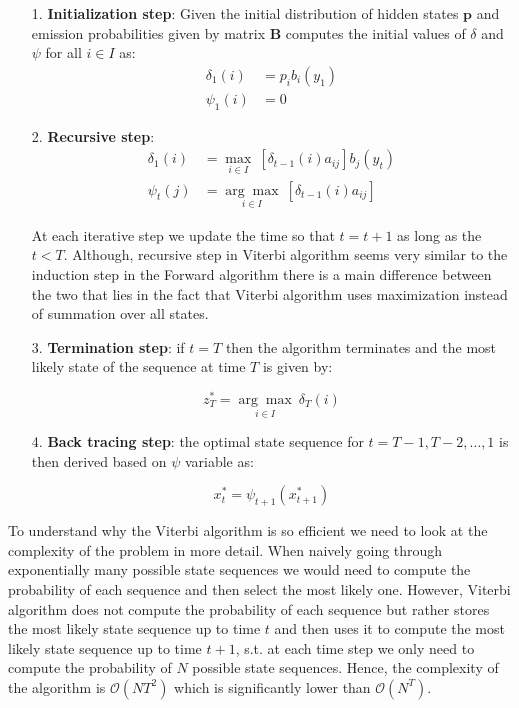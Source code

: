 \begin{itemize}
\item[1.] \textbf{Initialization step}: Given the initial distribution of hidden states $\textbf{p}$ and emission probabilities given by matrix $\textbf{B}$ computes the initial values 
of $\delta$ and $\psi$ for all $i \in I$ as:
\begin{align}
\delta_1(i) &= p_i b_i(y_1)  \\
\psi_1(i)& = 0
\end{align}

\item[2.] \textbf{Recursive step}:
\begin{align}
\delta_1(i) &= \underset{i \in I}{\max} \: \left[\delta_{t-1}(i)a_{ij}\right] b_j(y_t)  \\
\psi_t(j)& = \underset{i \in I}{\arg\max} \: \left[\delta_{t-1}(i)a_{ij}\right]
\end{align}

At each iterative step we update the time so that $t=t+1$ as long as the $t<T$. Although, recursive step in Viterbi algorithm seems very similar to the 
induction step in the Forward algorithm there is a main difference between the two that lies in the fact that Viterbi algorithm uses maximization instead of summation 
over all states. 

\item[3.] \textbf{Termination step}: if $t=T$ then the algorithm terminates and the most likely state of the sequence at time $T$ is given by:

\begin{equation}
z_T^* = \underset{i \in I}{\arg\max} \: \delta_{T}(i)
\end{equation}

\item[4.] \textbf{Back tracing step}: the optimal state sequence for $t = T-1,T-2,\ldots,1$ is then derived based on $\psi$ variable as:

\begin{equation}
x_t^* = \psi_{t+1}(x_{t+1}^*)
\end{equation}

\end{itemize}

To understand why the Viterbi algorithm is so efficient we need to look at the complexity of the problem in more detail. When naively going through exponentially many possible state sequences we would need to compute the probability of each sequence and then select the most likely one. However, Viterbi algorithm does not compute the probability of each sequence but rather stores the most likely state sequence up to time $t$ and then uses it to compute the most likely state sequence up to time $t+1$, s.t. at each time step we only need to compute the probability of $N$ possible state sequences. Hence, the complexity of the algorithm is $\mathcal{O}(NT^2)$ which is significantly lower than $\mathcal{O}(N^T)$. \citep{Bishop2006}

